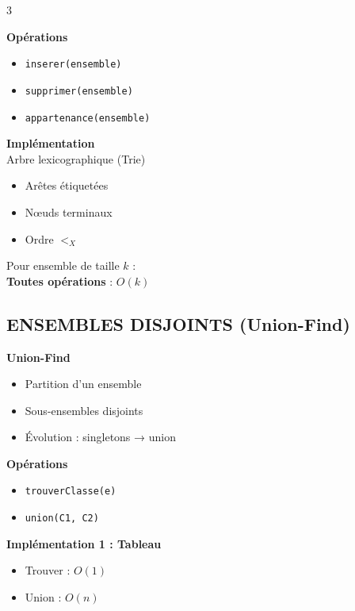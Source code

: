 \documentclass[10pt,a4paper,landscape]{article}
\begin{document}
\begin{multicols}{3}
\begin{algobox}
\textbf{Opérations}
\begin{itemize}
\item \texttt{inserer(ensemble)}
\item \texttt{supprimer(ensemble)}
\item \texttt{appartenance(ensemble)}
\end{itemize}
\end{algobox}

\begin{importbox}
\textbf{Implémentation}\\
Arbre lexicographique (Trie)
\begin{itemize}
\item Arêtes étiquetées
\item Nœuds terminaux
\item Ordre $<_X$
\end{itemize}
\end{importbox}

\begin{complexbox}
Pour ensemble de taille $k$ :\\
\textbf{Toutes opérations} : $O(k)$
\end{complexbox}

\subsection*{ENSEMBLES DISJOINTS (Union-Find)}

\begin{defbox}
\textbf{Union-Find}
\begin{itemize}
\item Partition d'un ensemble
\item Sous-ensembles disjoints
\item Évolution : singletons → union
\end{itemize}
\end{defbox}

\begin{algobox}
\textbf{Opérations}
\begin{itemize}
\item \texttt{trouverClasse(e)}
\item \texttt{union(C1, C2)}
\end{itemize}
\end{algobox}

\begin{importbox}
\textbf{Implémentation 1 : Tableau}
\begin{itemize}
\item Trouver : $O(1)$
\item Union : $O(n)$
\end{itemize}


\end{importbox}
\end{multicols}
\end{document}
